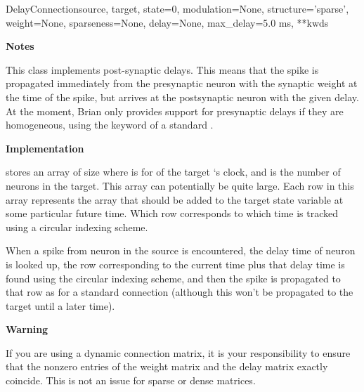 \documentclass[letterpaper,10pt,english]{manual}
\begin{document}
\begin{classdesc}{DelayConnection}{source, target, state=0, modulation=None, structure='sparse', weight=None, sparseness=None, delay=None, max\_delay=5.0 ms, **kwds}
\begin{description}
\end{description}

\textbf{Notes}

This class implements post-synaptic delays. This means that the spike is
propagated immediately from the presynaptic neuron with the synaptic
weight at the time of the spike, but arrives at the postsynaptic neuron
with the given delay. At the moment, Brian only provides support for
presynaptic delays if they are homogeneous, using the  keyword
of a standard .

\textbf{Implementation}

\hyperlink{brian.DelayConnection}{} stores an array of size  where
 is  for  of the target \hyperlink{brian.NeuronGroup}{}`s clock,
and  is the number of neurons in the target. This array can potentially
be quite large. Each row in this array represents the array that should be
added to the target state variable at some particular future time. Which
row corresponds to which time is tracked using a circular indexing scheme.

When a spike from neuron  in the source is encountered, the delay time
of neuron  is looked up, the row corresponding to the current time
plus that delay time is found using the circular indexing scheme, and then
the spike is propagated to that row as for a standard connection (although
this won't be propagated to the target until a later time).

\textbf{Warning}

If you are using a dynamic connection matrix, it is your responsibility to
ensure that the nonzero entries of the weight matrix and the delay matrix
exactly coincide. This is not an issue for sparse or dense matrices.
\end{classdesc}
\end{document}
